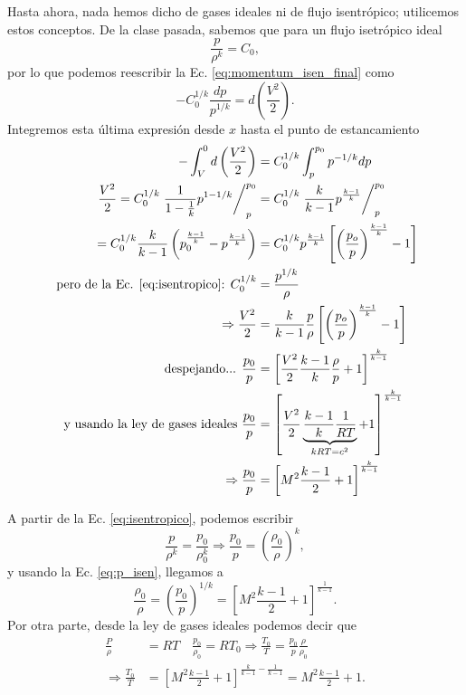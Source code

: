 Hasta ahora, nada hemos dicho de gases ideales ni de flujo isentrópico; utilicemos estos conceptos.
De la clase pasada, sabemos que para un flujo isetrópico ideal
%
\begin{equation}\label{eq:isentropico}
\frac{p}{\rho^k} = C_0,
\end{equation}
%
por lo que podemos reescribir la Ec. \eqref{eq:momentum_isen_final} como
%
\begin{equation}
-C_0^{1/k}\frac{dp}{p^{1/k}} = d\left(\frac{V^2}{2}\right).
\end{equation}
%
Integremos esta última expresión desde $x$ hasta el punto de estancamiento
%
\begin{align}\label{eq:p_isen}
-\int_V^0d\left(\frac{V^2}{2}\right) &= C_0^{1/k}\int_p^{p_0}p^{-1/k}dp\nonumber\\
\frac{V^2}{2} = C_0^{1/k} \left.\frac{1}{1-\frac{1}{k}}p^{1-1/k}\right/_p^{p_0}&= C_0^{1/k}\left.\frac{k}{k-1}p^{\frac{k-1}{k}}\right/_p^{p_0}\nonumber\\
=C_0^{1/k}\frac{k}{k-1}\left(p_0^{\frac{k-1}{k}}-p^{\frac{k-1}{k}}\right) &= C_0^{1/k}p^{\frac{k-1}{k}}\left[\left(\frac{p_o}{p}\right)^{\frac{k-1}{k}}-1\right]\\
\text{ pero de la Ec. \eqref{eq:isentropico}:   } C_0^{1/k} &= \frac{p^{1/k}}{\rho}\nonumber\\
\Rightarrow\frac{V^2}{2}&=\frac{k}{k-1}\frac{p}{\rho}\left[\left(\frac{p_o}{p}\right)^{\frac{k-1}{k}}-1\right]\nonumber\\
\text{despejando...   } \frac{p_0}{p} &= \left[\frac{V^2}{2}\frac{k-1}{k}\frac{\rho}{p}+1\right]^\frac{k}{k-1}\nonumber\\
\text{y usando la ley de gases ideales   } \frac{p_0}{p} &= \left[\frac{V^2}{2}\underbrace{\frac{k-1}{k}\frac{1}{RT}}_{kRT=c^2}+1\right]^\frac{k}{k-1}\nonumber\\
\Rightarrow \frac{p_0}{p} &= \left[M^2\frac{k-1}{2}+1\right]^\frac{k}{k-1}
\end{align}

A partir de la Ec. \eqref{eq:isentropico}, podemos escribir
%
\begin{equation}
\frac{p}{\rho^k} = \frac{p_0}{\rho_0^k} \Rightarrow \frac{p_0}{p} = \left(\frac{\rho_0}{\rho}\right)^k,
\end{equation}
%
y usando la Ec. \eqref{eq:p_isen}, llegamos a
%
\begin{equation}\label{eq:rho_isen}
\frac{\rho_0}{\rho} = \left(\frac{p_0}{p}\right)^{1/k} = \left[M^2\frac{k-1}{2}+1\right]^\frac{1}{k-1}.
\end{equation}
%
Por otra parte, desde la ley de gases ideales podemos decir que
%
\begin{align}\label{eq:T_isen}
\frac{P}{\rho}&=RT \quad \frac{p_0}{\rho_0} = RT_0\Rightarrow \frac{T_0}{T} = \frac{p_0}{p}\frac{\rho}{\rho_0}\nonumber\\
\Rightarrow \frac{T_0}{T} &= \left[M^2\frac{k-1}{2}+1\right]^{\frac{k}{k-1}-\frac{1}{k-1}} = M^2\frac{k-1}{2}+1.
\end{align}

